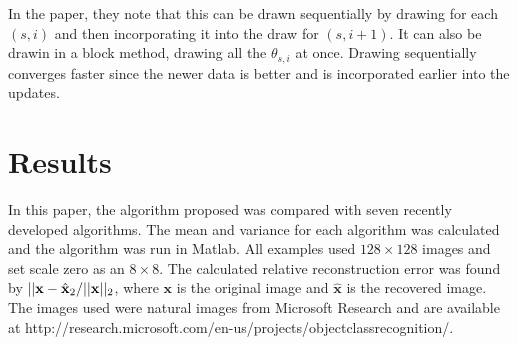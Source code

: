 \documentclass{IEEEtran}
\begin{document}
In the paper, they note that this can be drawn sequentially by drawing
for each $(s,i)$ and then incorporating it into the draw for $(s,i+1)$.  It can also be drawin
in a block method, drawing all the $\theta_{s,i}$ at once.  Drawing
sequentially converges faster since the newer data is better and is
incorporated earlier into the updates.

\section{Results}

In this paper, the algorithm proposed was compared with seven recently
developed algorithms.  The mean and variance for each algorithm was
calculated and the algorithm was run in Matlab.  All examples used
$128\times128$ images and set scale zero as an $8\times8$.  The
calculated relative reconstruction error was found by
$||\mathbf{x}-\hat{\mathbf{x}}\\_2/||\mathbf{x}||_2$, where
    $\mathbf{x}$ is the original image and $\hat{\mathbf{x}}$ is the
recovered image.  The images used were natural images from Microsoft
Research and are available at http://research.microsoft.com/en-us/projects/objectclassrecognition/.



\end{document}
